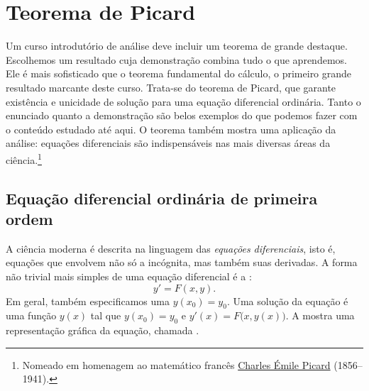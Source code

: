 
\sectionnewpage
\section{Teorema de Picard}
\label{sec:picard}



Um curso introdutório de análise deve incluir um teorema de grande destaque.
Escolhemos um resultado cuja demonstração combina tudo o que aprendemos.
Ele é mais sofisticado que o teorema fundamental do cálculo, o primeiro
grande resultado marcante deste curso. Trata-se do teorema de Picard, que
garante existência e unicidade de solução para uma equação diferencial
ordinária. Tanto o enunciado quanto a demonstração são belos exemplos do
que podemos fazer com o conteúdo estudado até aqui. O teorema também mostra
uma aplicação da análise: equações diferenciais são indispensáveis nas
mais diversas áreas da ciência.\footnote{Nomeado em homenagem ao
matemático francês
\href{https://en.wikipedia.org/wiki/\%C3\%89mile_Picard}{Charles \'Emile Picard}
(1856--1941).}

\subsection{Equação diferencial ordinária de primeira ordem}

A ciência moderna é descrita na linguagem das
\emph{equações diferenciais},
isto é, equações que envolvem não só a incógnita, mas também suas
derivadas. A forma não trivial mais simples de uma equação diferencial é a
\emph{}
:
\begin{equation*}
y' = F(x,y) .
\end{equation*}
Em geral, também especificamos uma \emph{}
$y(x_0)=y_0$. Uma solução da equação é uma função $y(x)$ tal que
$y(x_0)=y_0$ e $y'(x) = F\bigl(x,y(x)\bigr)$. A
 mostra uma representação gráfica da equação,
chamada \emph{}.
\begin{myfigureht}
\caption{Um \emph{campo de direções} que indica a inclinação $F(x,y)$ em
cada ponto; neste caso, $F(x,y)=x(1-y)$. Uma solução passa pelo ponto
$(x_0,y_0)=(1,0{,}3)$ e acompanha as inclinações.\label{fig:sampleslopes}}
\end{myfigureht}

